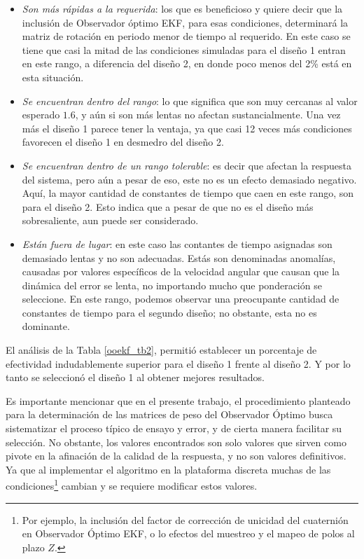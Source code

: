 \documentclass[10pt]{report}
\numberwithin{equation}{chapter}
\numberwithin{algorithm}{chapter}
\begin{document}
\begin{itemize}
\item \emph{Son más rápidas a la requerida}: los que es beneficioso y quiere decir que la inclusión de Observador óptimo EKF, para esas condiciones, determinará la matriz de rotación en periodo menor de tiempo al requerido. En este caso se tiene que casi la mitad de las condiciones simuladas para el diseño 1 entran en este rango, a diferencia del diseño 2, en donde poco menos del 2\% está en esta situación.
\item \emph{Se encuentran dentro del rango}: lo que significa que son muy cercanas al valor esperado $1.6$, y aún si son más lentas no afectan sustancialmente. Una vez más el diseño 1 parece tener la ventaja, ya que casi 12 veces más condiciones favorecen el diseño 1 en desmedro del diseño 2.
\item \emph{Se encuentran dentro de un rango tolerable}: es decir que afectan la respuesta del sistema, pero aún a pesar de eso, este no es un efecto demasiado negativo. Aquí, la mayor cantidad de constantes de tiempo que caen en este rango, son para el diseño 2. Esto indica que a pesar de que no es el diseño más sobresaliente, aun puede ser considerado.
\item \emph{Están fuera de lugar}: en este caso las contantes de tiempo asignadas son demasiado lentas y no son adecuadas. Estás son denominadas anomalías, causadas por valores específicos de la velocidad angular que causan que la dinámica del error se lenta, no importando mucho que ponderación se seleccione. En este rango, podemos observar una preocupante cantidad de constantes de tiempo para el segundo diseño; no obstante, esta no es dominante.
\end{itemize}
El análisis de la Tabla \ref{ooekf_tb2}, permitió establecer un porcentaje de efectividad indudablemente superior para el diseño 1 frente al diseño 2. Y por lo tanto se seleccionó el diseño 1 al obtener mejores resultados. \par
Es importante mencionar que en el presente trabajo, el procedimiento planteado para la determinación de las matrices de peso del Observador Óptimo busca sistematizar el proceso típico de ensayo y error, y de cierta manera facilitar su selección. No obstante, los valores encontrados son solo valores que sirven como pivote en la afinación de la calidad de la respuesta, y no son valores definitivos. Ya que al implementar el algoritmo en la plataforma discreta muchas de las condiciones\footnote{Por ejemplo, la inclusión del factor de corrección de unicidad del cuaternión en Observador Óptimo EKF, o lo efectos del muestreo y el mapeo de polos al plazo $Z$.} cambian y se requiere modificar estos valores.
\end{document}
